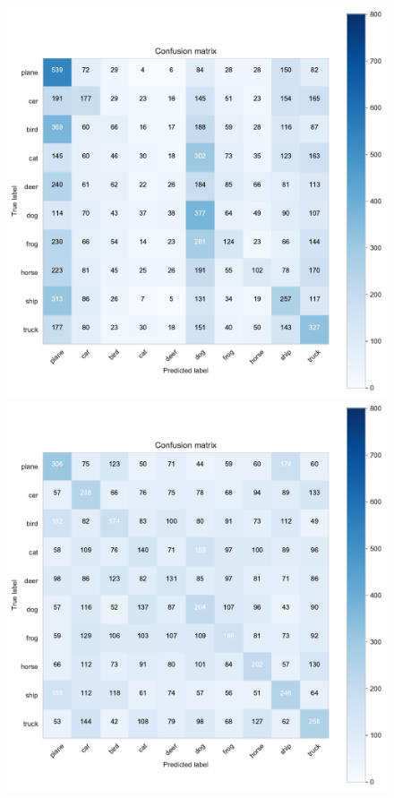 \documentclass[11pt]{article}
\begin{document}
\begin{figure}[H]
\begin{minipage}[c]{0.5\textwidth}
\includegraphics[width=1\linewidth]{figures/Cifar/CM__NB_BOW.pdf}
\end{minipage}
\begin{minipage}[c]{0.5\textwidth}
\includegraphics[width=1\linewidth]{figures/Cifar/CM__Rndf_BOW.pdf}

\end{minipage}
\end{figure}
\end{document}
